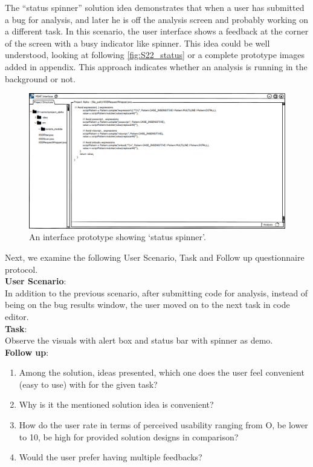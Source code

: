 The “status spinner” solution idea demonstrates that when a user has submitted a bug for analysis, and later he is off the analysis screen and probably working on a different task. In this scenario, the user interface shows a feedback at the corner of the screen with a busy indicator like spinner. This idea could be well understood, looking at following \autoref{fig:S22_status} or a complete prototype images added in appendix. This approach indicates whether an analysis is running in the background or not. \\


\begin{figure}[hbt!]
	\centering
	\includegraphics[width=\linewidth]{figures/solution_ideas_snaps/S22_status}
	\caption{An interface prototype showing ‘status spinner’.}
	\label{fig:S22_status}
\end{figure}

Next, we examine the following User Scenario, Task and Follow up questionnaire protocol. \\

\textbf{User Scenario}: \\

In addition to the previous scenario, after submitting code for analysis, instead of being on the bug results window, the user moved on to the next task in code editor. \\

\textbf{Task}: \\

Observe the visuals with alert box and status bar with spinner as demo. \\

\textbf{Follow up}: \\

\begin{enumerate}
\item Among the solution, ideas presented, which one does the user feel convenient (easy to use) with for the given task?
\item Why is it the mentioned solution idea is convenient?
\item How do the user rate in terms of perceived usability ranging from O, be lower to 10, be high for provided solution designs in comparison?
\item Would the user prefer having multiple feedbacks?
\end{enumerate}

